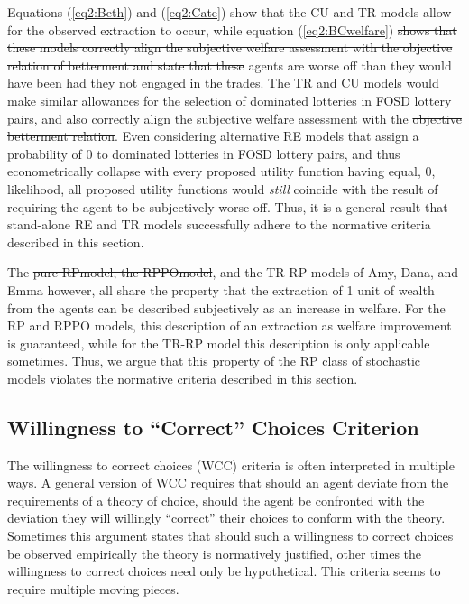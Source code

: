 \documentclass[11pt,a4paper]{report}
\providecommand{\DIFaddtex}[1]{{\protect\color{blue}\uwave{#1}}} %
\providecommand{\DIFdeltex}[1]{{\protect\color{red}\sout{#1}}}                      %
\providecommand{\DIFaddbegin}{} %
\providecommand{\DIFaddend}{} %
\providecommand{\DIFdelbegin}{} %
\providecommand{\DIFdelend}{} %
\providecommand{\DIFadd}[1]{\texorpdfstring{\DIFaddtex{#1}}{#1}} %
\providecommand{\DIFdel}[1]{\texorpdfstring{\DIFdeltex{#1}}{}} %
\newcommand{\DIFscaledelfig}{0.5}
\newlength{\DIFdelgraphicswidth} %
\newlength{\DIFdelgraphicsheight} %
\newcommand{\DIFaddincludegraphics}[2][]{{\color{blue}\fbox{\DIFOincludegraphics[#1]{#2}}}} %
\newcommand{\DIFdelincludegraphics}[2][]{%
\sbox{\DIFdelgraphicsbox}{\DIFOincludegraphics[#1]{#2}}%
\settoboxwidth{\DIFdelgraphicswidth}{\DIFdelgraphicsbox} %
\settoboxtotalheight{\DIFdelgraphicsheight}{\DIFdelgraphicsbox} %
\scalebox{\DIFscaledelfig}{%
\parbox[b]{\DIFdelgraphicswidth}{\usebox{\DIFdelgraphicsbox}\\[-\baselineskip] \rule{\DIFdelgraphicswidth}{0em}}\llap{\resizebox{\DIFdelgraphicswidth}{\DIFdelgraphicsheight}{%
\setlength{\unitlength}{\DIFdelgraphicswidth}%
\begin{picture}(1,1)%
\thicklines\linethickness{2pt} %
{\color[rgb]{1,0,0}\put(0,0){\framebox(1,1){}}}%
{\color[rgb]{1,0,0}\put(0,0){\line( 1,1){1}}}%
{\color[rgb]{1,0,0}\put(0,1){\line(1,-1){1}}}%
\end{picture}%
}\hspace*{3pt}}} %
} %
\DeclareRobustCommand{\DIFaddbegin}{\DIFOaddbegin \let\includegraphics\DIFaddincludegraphics} %
\DeclareRobustCommand{\DIFaddend}{\DIFOaddend \let\includegraphics\DIFOincludegraphics} %
\DeclareRobustCommand{\DIFdelbegin}{\DIFOdelbegin \let\includegraphics\DIFdelincludegraphics} %
\DeclareRobustCommand{\DIFdelend}{\DIFOaddend \let\includegraphics\DIFOincludegraphics} %
\begin{document}
Equations (\ref{eq2:Beth}) and (\ref{eq2:Cate}) show that the CU and TR models allow for the observed extraction to occur, while equation (\ref{eq2:BCwelfare}) \DIFdelbegin \DIFdel{shows that these models correctly align the subjective welfare assessment with the objective relation of betterment and state that these }\DIFdelend \DIFaddbegin \DIFadd{states that these }\DIFaddend agents are worse off than they would have been had they not engaged in the trades.
The TR and CU models would make similar allowances for the selection of dominated lotteries in FOSD lottery pairs, and also correctly align the subjective welfare assessment with the \DIFdelbegin \DIFdel{objective betterment relation}\DIFdelend \DIFaddbegin \DIFadd{EE criterion}\DIFaddend .
Even considering alternative RE models that assign a probability of $0$ to dominated lotteries in FOSD lottery pairs, and thus econometrically collapse with every proposed utility function having equal, $0$, likelihood, all proposed utility functions would \textit{still} coincide with the result of requiring the agent to be subjectively worse off.
Thus, it is a general result that stand-alone RE and TR models successfully adhere to the normative criteria described in this section.

The \DIFdelbegin \DIFdel{pure RPmodel, the RPPOmodel}\DIFdelend \DIFaddbegin \DIFadd{RP}\DIFaddend , \DIFaddbegin \DIFadd{RPPO, }\DIFaddend and the TR-RP models of Amy, Dana, and Emma however, all share the property that the extraction of 1 unit of wealth from the agents can be described subjectively as an increase in welfare.
For the RP and RPPO models, this description of an extraction as welfare improvement is guaranteed, while for the TR-RP model this description is only applicable sometimes.
Thus, we argue that this property of the RP class of stochastic models violates the normative criteria described in this section.


\subsection{Willingness to \enquote{Correct} Choices Criterion}

The willingness to correct choices (WCC) criteria is often interpreted in multiple ways.
A general version of WCC requires that should an agent deviate from the requirements of a theory of choice, should the agent be confronted with the deviation they will willingly \enquote{correct} their choices to conform with the theory.
Sometimes this argument states that should such a willingness to correct choices be observed empirically the theory is normatively justified, other times the willingness to correct choices need only be hypothetical.
This criteria seems to require multiple moving pieces.
\end{document}
